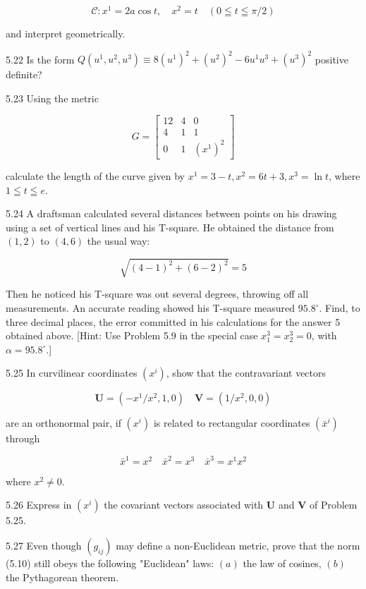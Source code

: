 \documentclass[10pt]{article}
\begin{document}
$$
\mathscr{C}: x^{1}=2 a \cos t, \quad x^{2}=t \quad(0 \leqq t \leqq \pi / 2)
$$

and interpret geometrically.

5.22 Is the form $Q\left(u^{1}, u^{2}, u^{3}\right) \equiv 8\left(u^{1}\right)^{2}+\left(u^{2}\right)^{2}-6 u^{1} u^{3}+\left(u^{3}\right)^{2}$ positive definite?

5.23 Using the metric

$$
G=\left[\begin{array}{rrc}
12 & 4 & 0 \\
4 & 1 & 1 \\
0 & 1 & \left(x^{1}\right)^{2}
\end{array}\right]
$$

calculate the length of the curve given by $x^{1}=3-t, x^{2}=6 t+3, x^{3}=\ln t$, where $1 \leqq t \leqq e$.

5.24 A draftsman calculated several distances between points on his drawing using a set of vertical lines and his $\mathrm{T}$-square. He obtained the distance from $(1,2)$ to $(4,6)$ the usual way:

$$
\sqrt{(4-1)^{2}+(6-2)^{2}}=5
$$

Then he noticed his T-square was out several degrees, throwing off all measurements. An accurate reading showed his T-square measured $95.8^{\circ}$. Find, to three decimal places, the error committed in his calculations for the answer 5 obtained above. [Hint: Use Problem 5.9 in the special case $x_{1}^{3}=x_{2}^{3}=0$, with $\alpha=95.8^{\circ}$.]

5.25 In curvilinear coordinates $\left(x^{i}\right)$, show that the contravariant vectors

$$
\mathbf{U}=\left(-x^{1} / x^{2}, 1,0\right) \quad \mathbf{V}=\left(1 / x^{2}, 0,0\right)
$$

are an orthonormal pair, if $\left(x^{i}\right)$ is related to rectangular coordinates $\left(\bar{x}^{i}\right)$ through

$$
\bar{x}^{1}=x^{2} \quad \bar{x}^{2}=x^{3} \quad \bar{x}^{3}=x^{1} x^{2}
$$

where $x^{2} \neq 0$.

5.26 Express in $\left(x^{i}\right)$ the covariant vectors associated with $\mathbf{U}$ and $\mathbf{V}$ of Problem 5.25.

5.27 Even though $\left(g_{i j}\right)$ may define a non-Euclidean metric, prove that the norm (5.10) still obeys the following "Euclidean" laws: $(a)$ the law of cosines, $(b)$ the Pythagorean theorem.
\end{document}
